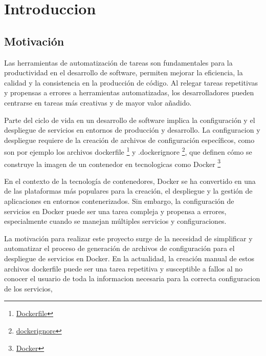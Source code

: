 \documentclass[12pt, a4paper, twoside]{article}
\begin{document}

\newpage




\newpage


\newpage

\tableofcontents
\newpage








\section{Introduccion}
\label{sec:Introduccion}

\subsection{Motivación}
Las herramientas de automatización de tareas son fundamentales para la productividad en el desarrollo de software, permiten mejorar la eficiencia, la calidad y la consistencia en la producción de código.
Al relegar tareas repetitivas y propensas a errores a herramientas automatizadas, los desarrolladores pueden centrarse en tareas más creativas y de mayor valor añadido.

Parte del ciclo de vida en un desarrollo de software implica la configuración y el despliegue de servicios en entornos de producción y desarrollo.
La configuracion y despliegue requiere de la creación de archivos de configuración específicos, como son por ejemplo los archivos dockerfile \footnote{\hyperref[sec:Dockerfile]{Dockerfile}} y .dockerignore \footnote{\hyperref[sec:dockerignore]{dockerignore}}, que definen cómo se construye la imagen de un contenedor en tecnologicas como Docker \footnote{ \hyperref[sec:Docker]{Docker}}

En el contexto de la tecnología de contenedores, Docker se ha convertido en una de las plataformas más populares para la creación, el despliegue y la gestión de aplicaciones en entornos contenerizados. 
Sin embargo, la configuración de servicios en Docker puede ser una tarea compleja y propensa a errores, especialmente cuando se manejan múltiples servicios y configuraciones.

La motivación para realizar este proyecto surge de la necesidad de simplificar y automatizar el proceso de generación de archivos de configuración para el despliegue de servicios en Docker. 
En la actualidad, la creación manual de estos archivos dockerfile puede ser una tarea repetitiva y susceptible a fallos al no conocer el usuario de toda la informacion necesaria para la correcta configuracion de los servicios, 
\end{document}
